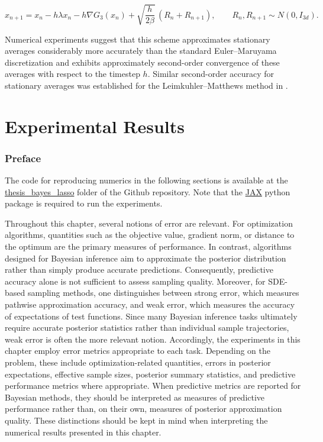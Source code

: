 \documentclass[11pt, twoside]{report}
\begin{document}
\[
x_{n+1}
=
x_n
-
h\lambda x_n
-
h\nabla G_3(x_n)
+
\sqrt{\frac{h}{2\beta}}
\,(R_n+R_{n+1}),
\qquad
R_n,R_{n+1}\sim N(0,I_{3d}).
\]

Numerical experiments suggest that this scheme approximates stationary averages
considerably more accurately than the standard Euler--Maruyama discretization and
exhibits approximately second-order convergence of these averages with respect to the
timestep $h$. Similar second-order accuracy for stationary averages was established for the Leimkuhler--Matthews method in \cite{LeimkuhlerMatthewsTretyakov2014}.

\chapter{Experimental Results}
\subsection{Preface}
The code for reproducing numerics in the following sections is available at the \href{https://github.com/icheltso/thesis/tree/main/thesis\_bayes\_lasso}{thesis\_bayes\_lasso} folder of the Github repository. Note that the \href{https://docs.jax.dev/en/latest/installation.html#installation}{JAX} python package is required to run the experiments.

Throughout this chapter, several notions of error are relevant. For optimization algorithms, quantities such as the objective value, gradient norm, or distance to the optimum are the primary measures of performance. In contrast, algorithms designed for Bayesian inference aim to approximate the posterior distribution rather than simply produce accurate predictions. Consequently, predictive accuracy alone is not sufficient to assess sampling quality. Moreover, for SDE-based sampling methods, one distinguishes between strong error, which measures pathwise approximation accuracy, and weak error, which measures the accuracy of expectations of test functions. Since many Bayesian inference tasks ultimately require accurate posterior statistics rather than individual sample trajectories, weak error is often the more relevant notion. Accordingly, the experiments in this chapter employ error metrics appropriate to each task. Depending on the problem, these include optimization-related quantities, errors in posterior expectations, effective sample sizes, posterior summary statistics, and predictive performance metrics where appropriate. When predictive metrics are reported for Bayesian methods, they should be interpreted as measures of predictive performance rather than, on their own, measures of posterior approximation quality. These distinctions should be kept in mind when interpreting the numerical results presented in this chapter.
\end{document}

